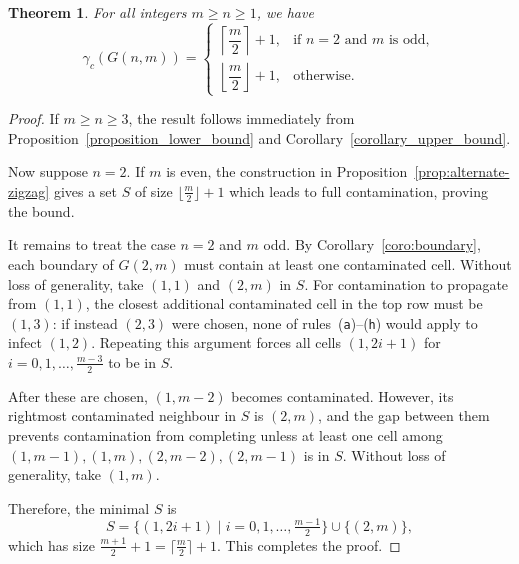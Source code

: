 \documentclass[letterpaper,12pt]{article}
\newtheorem{theorem}{Theorem}
\begin{document}
\begin{theorem}\label{theo:main}
    For all integers $m \geq n \geq 1$, we have 
    \begin{equation}
        \gamma_c(G(n,m)) =
        \begin{cases}
            \left\lceil \dfrac{m}{2} \right\rceil + 1, & \text{if $n=2$ and $m$ is odd}, \\[0.6em]
            \left\lfloor \dfrac{m}{2} \right\rfloor + 1, & \text{otherwise}.
        \end{cases}
    \end{equation}
\end{theorem}

\begin{proof}
    If $m \geq n \geq 3$, the result follows immediately from Proposition~\ref{proposition_lower_bound} 
    and Corollary~\ref{corollary_upper_bound}.

    Now suppose $n = 2$. If $m$ is even, the construction in 
    Proposition~\ref{prop:alternate-zigzag} gives a set $S$ 
    of size $\lfloor \frac{m}{2} \rfloor + 1$ which leads to full contamination, proving the bound.

    It remains to treat the case $n=2$ and $m$ odd. By Corollary~\ref{coro:boundary}, 
    each boundary of $G(2,m)$ must contain at least one contaminated cell. Without loss of generality, 
    take $(1,1)$ and $(2,m)$ in $S$. For contamination to propagate from $(1,1)$, 
    the closest additional contaminated cell in the top row must be $(1,3)$: 
    if instead $(2,3)$ were chosen, none of rules~\textup{(\texttt{a})}--\textup{(\texttt{h})} would apply to infect $(1,2)$. 
    Repeating this argument forces all cells $(1,2i+1)$ for 
    $i=0,1,\dots,\frac{m-3}{2}$ to be in $S$.

    After these are chosen, $(1,m-2)$ becomes contaminated. However, its rightmost 
    contaminated neighbour in $S$ is $(2,m)$, and the gap between them prevents 
    contamination from completing unless at least one cell among 
    $(1,m-1), (1,m), (2,m-2), (2,m-1)$ is in $S$. Without loss of generality, 
    take $(1,m)$.

    Therefore, the minimal $S$ is
    \[
        S = \{ (1,2i+1) \mid i = 0,1,\dots,\tfrac{m-1}{2} \} \cup \{ (2,m) \},
    \]
    which has size $\frac{m+1}{2} + 1 = \lceil \frac{m}{2} \rceil + 1$. This completes the proof.\qedhere
\end{proof}
\end{document}
